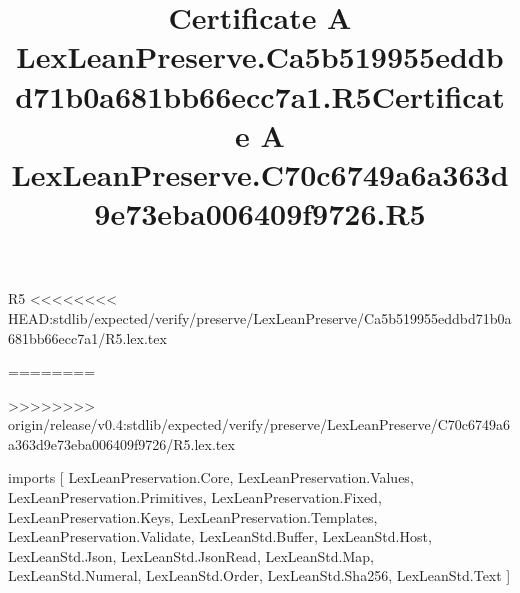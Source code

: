 \begin{lexlean}{R5}
<<<<<<<< HEAD:stdlib/expected/verify/preserve/LexLeanPreserve/Ca5b519955eddbd71b0a681bb66ecc7a1/R5.lex.tex
\title{Certificate A LexLeanPreserve.Ca5b519955eddbd71b0a681bb66ecc7a1.R5}
========
\title{Certificate A LexLeanPreserve.C70c6749a6a363d9e73eba006409f9726.R5}
>>>>>>>> origin/release/v0.4:stdlib/expected/verify/preserve/LexLeanPreserve/C70c6749a6a363d9e73eba006409f9726/R5.lex.tex
\begin{coremodule}
imports [
  LexLeanPreservation.Core,
  LexLeanPreservation.Values,
  LexLeanPreservation.Primitives,
  LexLeanPreservation.Fixed,
  LexLeanPreservation.Keys,
  LexLeanPreservation.Templates,
  LexLeanPreservation.Validate,
  LexLeanStd.Buffer,
  LexLeanStd.Host,
  LexLeanStd.Json,
  LexLeanStd.JsonRead,
  LexLeanStd.Map,
  LexLeanStd.Numeral,
  LexLeanStd.Order,
  LexLeanStd.Sha256,
  LexLeanStd.Text
]


\end{coremodule}
\end{lexlean}
